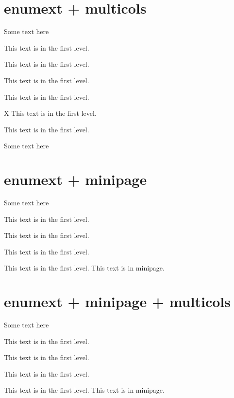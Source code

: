 \documentclass{article}
\begin{document}
\section{enumext + multicols}
Some text here

\begin{enumext}[columns=2, labelwidth=1cm,labelsep=0.25cm,align=left, wrap-label=\textbf{(#1}, label=\arabic*.),partopsep=0.5cm]
  \item This text is in the first level.
  \item This text is in the first level.
  \item This text is in the first level.
  \item This text is in the first level.
  \item[X] This text is in the first level.
  \item* This text is in the first level.
\end{enumext}

Some text here

\section{enumext + minipage}

Some text here

\begin{enumext}[labelwidth=1cm,labelsep=0.25cm,align=left,partopsep=0.5cm,mini-env=0.4\linewidth]
  \item This text is in the first level.
  \item This text is in the first level.
  \item This text is in the first level.
  \item This text is in the first level.
  \miniright
    This text is in minipage.
\end{enumext}

\section{enumext + minipage + multicols}

Some text here

\begin{enumext}[columns=2,labelwidth=1cm,labelsep=0.25cm,align=left,partopsep=0.5cm,mini-env=0.4\linewidth]
  \item This text is in the first level.
  \item This text is in the first level.
  \item This text is in the first level.
  \item This text is in the first level.
  \miniright
    This text is in minipage.
\end{enumext}
\end{document}
